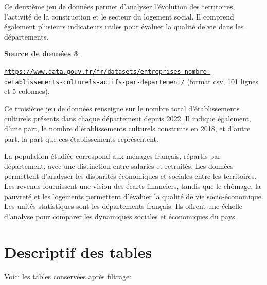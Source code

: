 \documentclass[mstat,12pt]{unswthesis}
\begin{document}
Ce deuxième jeu de données permet d'analyser l'évolution des
territoires, l'activité de la construction et le secteur du logement
social. Il comprend également plusieurs indicateurs utiles pour évaluer
la qualité de vie dans les départements.

\bigskip

\textbf{Source de données 3}:

\tiny

\texttt{\url{https://www.data.gouv.fr/fr/datasets/entreprises-nombre-detablissements-culturels-actifs-par-departement/}}
\normalsize (format csv, 101 lignes et 5 colonnes).

Ce troisième jeu de données renseigne sur le nombre total
d'établissements culturels présents dans chaque département depuis 2022.
Il indique également, d'une part, le nombre d'établissements culturels
construits en 2018, et d'autre part, la part que ces établissements
représentent.

\medskip

La population étudiée correspond aux ménages français, répartis par
département, avec une distinction entre salariés et retraités. Les
données permettent d'analyser les disparités économiques et sociales
entre les territoires. Les revenus fournissent une vision des écarts
financiers, tandis que le chômage, la pauvreté et les logements
permettent d'évaluer la qualité de vie socio-économique. Les unités
statistiques sont les départements français. Ils offrent une échelle
d'analyse pour comparer les dynamiques sociales et économiques du pays.

\section{Descriptif des tables}\label{descriptif-des-tables}

Voici les tables conservées après filtrage:
\end{document}
